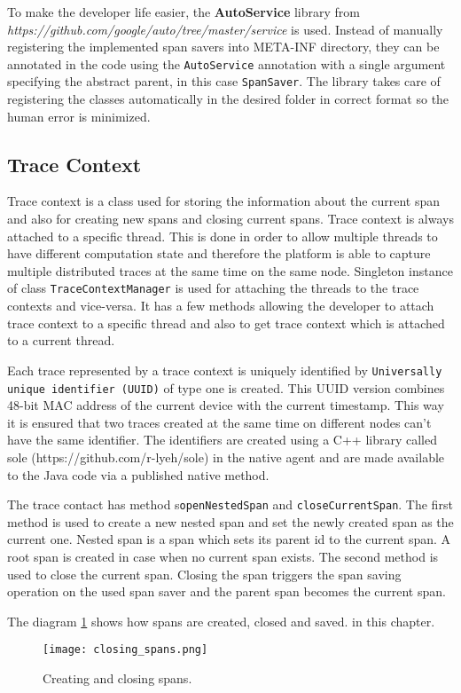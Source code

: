 To make the developer life easier, the \textbf{AutoService} library from \textit{https://github.com/google/auto/tree/master/service} is used. Instead of manually registering the implemented span savers into META-INF directory, they can be annotated in the code using the \texttt{AutoService} annotation with a single argument specifying the abstract parent, in this case \texttt{SpanSaver}. The library takes care of registering the classes automatically in the desired folder in correct format so the human error is minimized.

\subsection{Trace Context}
Trace context is a class used for storing the information about the current span and also for creating new spans and closing current spans. Trace context is always attached to a specific thread. This is done in order to allow multiple threads to have different computation state and therefore the platform is able to capture multiple distributed traces at the same time on the same node. Singleton instance of class \texttt{TraceContextManager} is used for attaching the threads to the trace contexts and vice-versa. It has a few methods allowing the developer to attach trace context to a specific thread and also to get trace context which is attached to a current thread.

Each trace represented by a trace context is uniquely identified by \texttt{Universally unique identifier (UUID)} of type one is created. This UUID version combines 48-bit MAC address of the current device with the current timestamp. This way it is ensured that two traces created at the same time on different nodes can't have the same identifier. The identifiers are created using a C++ library called sole (https://github.com/r-lyeh/sole) in the native agent and are made available to the Java code via a published native method.

The trace contact has method s\texttt{openNestedSpan} and \texttt{closeCurrentSpan}. The first method is used to create a new nested span and set the newly created span as the current one. Nested span is a span which sets its parent id to the current span. A root span is created in case when no current span exists. The second method is used to close the current span. Closing the span triggers the span saving operation on the used span saver and the parent span becomes the current span.

The diagram \ref{fig:closing_spans} shows how spans are created, closed and saved.  in this chapter. \begin{figure}
	\centering
	\texttt{[image: closing\_spans.png]}
	\caption{Creating and closing spans.}
	\label{fig:closing_spans}
\end{figure}

